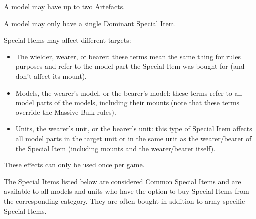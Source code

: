 
A model may have up to two Artefacts.

\newpage
{}


A model may only have a single Dominant Special Item.


Special Items may affect different targets:

\begin{itemize}
\item The wielder, wearer, or bearer: these terms mean the same thing for rules purposes and refer to the model part the Special Item was bought for (and don't affect its mount).
\item Models, the wearer's model, or the bearer's model: these terms refer to all model parts of the models, including their mounts (note that these terms override the Massive Bulk rules).
\item Units, the wearer's unit, or the bearer's unit: this type of Special Item affects all model parts in the target unit or in the same unit as the wearer/bearer of the Special Item (including mounts and the wearer/bearer itself).
\end{itemize}


These effects can only be used once per game.


The Special Items listed below are considered Common Special Items and are available to all models and units who have the option to buy Special Items from the corresponding category. They are often bought in addition to army-specific Special Items.



\startsummaries
{}


